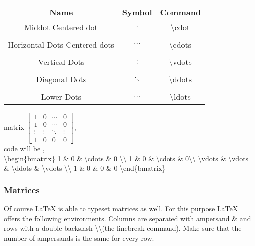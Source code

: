 \begin{center}
\begin{tabular}{ccc}
\toprule  %
Name&	Symbol&	Command\\
\midrule  %
Middot \/ Centered dot
  & $\cdot$
  & \textbackslash cdot\\
\\
Horizontal Dots \/ Centered dots 
  & $\cdots$
  & \textbackslash cdots\\
\\
Vertical Dots 
  & $\vdots$
  & \textbackslash vdots\\
\\
Diagonal Dots 
  & $\ddots$
  & \textbackslash ddots\\
\\
Lower Dots 
  & $\ldots$
  & \textbackslash ldots\\
\bottomrule %
\end{tabular}
\end{center}

matrix     
$\begin{bmatrix}
  1 & 0 & \cdots & 0\\
  1 & 0 & \cdots & 0\\
  \vdots & \vdots & \ddots & \vdots \\
  1 & 0 & 0 & 0
  \end{bmatrix}$, 
  \\
  code will be ,\\
  \textbackslash begin\{bmatrix\}
  1 \& 0 \& \textbackslash cdots \& 0 \textbackslash\textbackslash
  1 \& 0 \& \textbackslash cdots \& 0\textbackslash\textbackslash
  \textbackslash vdots \& \textbackslash vdots \& \textbackslash ddots \& \textbackslash vdots \textbackslash\textbackslash
  1 \& 0 \& 0 \& 0
  \textbackslash end\{bmatrix\}



  \subsubsection{Matrices}
  Of course LaTeX is able to typeset matrices as well. 
  For this purpose LaTeX offers the following environments. 
  Columns are separated with ampersand \& and rows with a double backslash \textbackslash\textbackslash (the linebreak command). Make sure that the number of ampersands is the same for every row.
  
